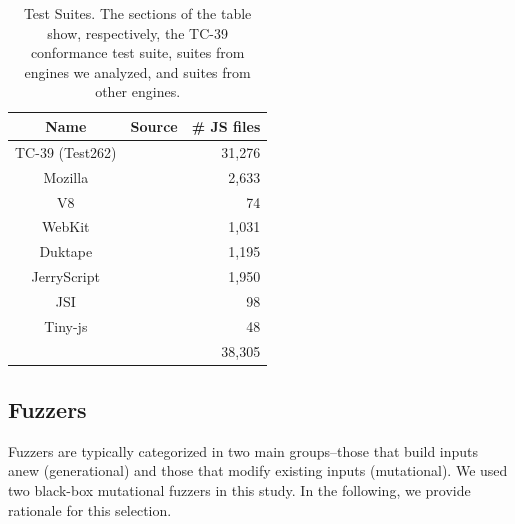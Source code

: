\documentclass[10pt,conference,anonymous]{IEEEtran}
\begin{document}
\begin{table}[t]
  \centering
  \caption{\label{tab:test-suites}Test Suites. The sections of the
    table show, respectively, the TC-39 conformance test suite, suites
    from engines we analyzed, and suites from other engines.}
  \begin{tabular}{ccr}
    \toprule
    Name & Source & \# JS files \\
    \midrule
    TC-39 (Test262) & \cite{ecma262-conformance-suite} & 31,276 \\
    \midrule
    Mozilla & \cite{mozilla} & 2,633 \\
    V8 & \cite{v8} & 74 \\
    WebKit & \cite{webkit} & 1,031 \\
    \midrule    
    Duktape & \cite{duktape} & 1,195 \\ 
    JerryScript & \cite{jerryscript} & 1,950 \\
    JSI & \cite{jsi} & 98 \\
    Tiny-js & \cite{tinyjs} & 48 \\    
    \midrule
     &  & 38,305 \\
   \bottomrule     
  \end{tabular}
\end{table}


\subsection{Fuzzers}
\label{sec:objects:fuzzers}


Fuzzers are typically categorized in two main groups--those that build
inputs anew (generational) and those that modify existing inputs
(mutational). We used two black-box mutational
fuzzers
in this study. In the following, we provide rationale for this
selection.
\end{document}
